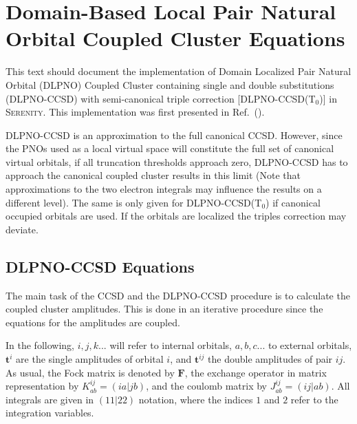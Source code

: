 \section{Domain-Based Local Pair Natural Orbital Coupled Cluster Equations}
This text should document the implementation of Domain Localized Pair Natural Orbital (DLPNO) Coupled Cluster
containing single and double substitutions (DLPNO-CCSD) with semi-canonical triple correction [DLPNO-CCSD(T$_0$)]
in \textsc{Serenity}. This implementation was first presented in Ref.~(\cite{Bensberg2020}).

DLPNO-CCSD is an approximation to the full canonical CCSD. However, since the PNOs used as a local virtual
space will constitute the full set of canonical virtual orbitals, if all truncation thresholds approach zero,
DLPNO-CCSD has to approach the canonical coupled cluster results in this limit (Note that approximations to
the two electron integrals may influence the results on a different level).
The same is only given for DLPNO-CCSD(T$_0$) if canonical occupied orbitals are used.
If the orbitals are localized the triples correction may deviate.

\subsection{DLPNO-CCSD Equations}
The main task of the CCSD and the DLPNO-CCSD procedure is to calculate the coupled cluster amplitudes.
This is done in an iterative procedure since the equations for the amplitudes are coupled.

In the following, $i,j,k...$ will refer to internal orbitals, $a,b,c...$ to external orbitals, $\pmb{t}^i$
are the single amplitudes of orbital $i$, and $\pmb{t}^{ij}$ the double amplitudes of pair $ij$. As usual,
the Fock matrix is denoted by $\pmb{F}$, the exchange operator in matrix representation by
${K}^{ij}_{ab}=(ia|jb)$, and the coulomb matrix by $J^{ij}_{ab}=(ij|ab)$. All integrals are given in $(11|22)$
notation, where the indices $1$ and $2$ refer to the integration variables.

